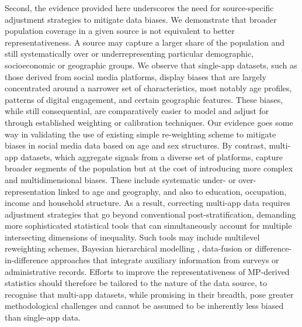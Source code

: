 \documentclass[]{rsos}%
\begin{document}
Second, the evidence provided here underscores the need for
source-specific adjustment strategies to mitigate data biases. We
demonstrate that broader population coverage in a given source is not
equivalent to better representativeness. A source may capture a larger
share of the population and still systematically over or
underrepresenting particular demographic, socioeconomic or geographic
groups. We observe that single-app datasets, such as those derived from
social media platforms, display biases that are largely concentrated
around a narrower set of characteristics, most notably age profiles,
patterns of digital engagement, and certain geographic features. These
biases, while still consequential, are comparatively easier to model and
adjust for through established weighting or calibration techniques. Our
evidence goes some way in validating the use of existing simple
re-weighting scheme to mitigate biases in social media data based on age
and sex structures. By contrast, multi-app datasets, which aggregate
signals from a diverse set of platforms, capture broader segments of the
population but at the cost of introducing more complex and
multidimensional biases. These include systematic under- or
over-representation linked to age and geography, and also to education,
occupation, income and household structure. As a result, correcting
multi-app data requires adjustment strategies that go beyond
conventional post-stratification, demanding more sophisticated
statistical tools that can simultaneously account for multiple
intersecting dimensions of inequality. Such tools may include multilevel
reweighting schemes, Bayesian hierarchical modelling \citep{rampazzo2021a},
data-fusion \citep{graells-garrido2023} or difference-in-difference
approaches \citep{zagheni2012} that integrate auxiliary information from
surveys or administrative records. Efforts to improve the
representativeness of MP-derived statistics should therefore be tailored
to the nature of the data source, to recognise that multi-app datasets,
while promising in their breadth, pose greater methodological challenges
and cannot be assumed to be inherently less biased than single-app data.
\end{document}
